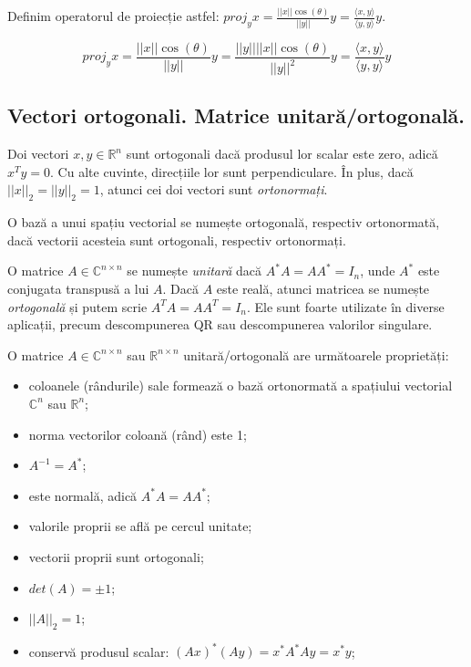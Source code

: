 \documentclass{exam}
\begin{document}
\par Definim operatorul de proiecție astfel: $proj_y x = \frac{||x|| \cos (\theta)}{||y||} y = \frac{\langle x, y \rangle}{\langle y, y \rangle} y$.

\begin{equation*}
	proj_y x = \frac{||x|| \cos (\theta)}{||y||} y = \frac{||y||||x|| \cos (\theta)}{||y||^2} y = \frac{\langle x, y \rangle}{\langle y, y \rangle} y
\end{equation*}

\subsection{Vectori ortogonali. Matrice unitară/ortogonală.}

\par Doi vectori $x, y \in \mathbb{R}^n$ sunt ortogonali dacă produsul lor
scalar este zero, adică $x^Ty = 0$. Cu alte cuvinte, direcțiile lor sunt
perpendiculare. În plus, dacă $||x||_2 = ||y||_2 = 1$, atunci cei doi
vectori sunt \textit{ortonormați}.

\par O bază a unui spațiu vectorial se numește ortogonală, respectiv ortonormată,
dacă vectorii acesteia sunt ortogonali, respectiv ortonormați.

\par O matrice $A \in \mathbb{C}^{n \times n}$ se numește \textit{unitară} dacă
$A^*A = AA^* = I_n$, unde $A^*$ este conjugata transpusă a lui $A$. Dacă $A$
este reală, atunci matricea se numește \textit{ortogonală} și putem scrie
$A^TA = AA^T = I_n$. Ele sunt foarte utilizate în diverse aplicații, precum
descompunerea QR sau descompunerea valorilor singulare.

\par O matrice $A \in \mathbb{C}^{n \times n}$ sau $\mathbb{R}^{n \times n}$
unitară/ortogonală are următoarele proprietăți:

\begin{itemize}
	\item coloanele (rândurile) sale formează o bază ortonormată a spațiului
	      vectorial $\mathbb{C}^n$ sau $\mathbb{R}^n$;
	\item norma vectorilor coloană (rând) este 1;
	\item $A^{-1} = A^*$;
	\item este normală, adică $A^*A = AA^*$;
	\item valorile proprii se află pe cercul unitate;
	\item vectorii proprii sunt ortogonali;
	\item $det(A) = \pm 1$;
	\item $||A||_2 = 1$;
	\item conservă produsul scalar: $(Ax)^*(Ay) = x^*A^*Ay = x^*y$;
\end{itemize}
\end{document}
